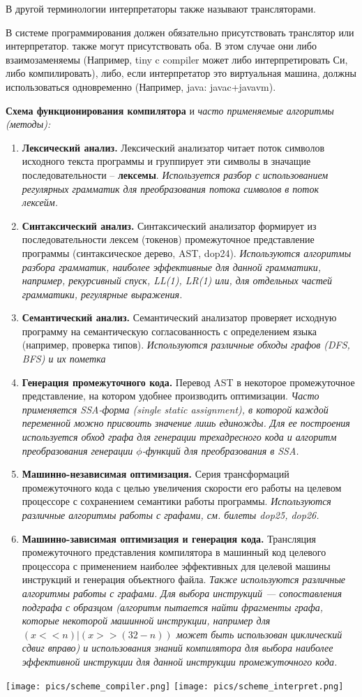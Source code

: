 В другой терминологии интерпретаторы также называют трансляторами.

В системе программирования должен обязательно присутствовать транслятор или интерпретатор.
также могут присутствовать оба. В этом случае они либо взаимозаменяемы (Например, tiny c compiler может либо интерпретировать Си, либо компилировать),
либо, если интерпретатор это виртуальная машина, должны использоваться одновременно (Например, java: javac+javavm).

\textbf{Схема функционирования компилятора} и \textit{часто применяемые алгоритмы (методы):}
\begin{enumerate}
    \item \textbf{Лексический анализ.} Лексический анализатор читает поток символов исходного текста программы и группирует эти символы в значащие последовательности -- \textbf{лексемы}.
    \textit{Используется разбор с использованием регулярных грамматик для преобразования потока символов в поток лексейм.}
    \item \textbf{Синтаксический анализ.} Синтаксический анализатор формирует из последовательности лексем (токенов) промежуточное представление программы (синтаксическое дерево, AST, dop24).
    	\textit{Используются алгоритмы разбора грамматик, наиболее эффективные для данной грамматики, например, рекурсивный спуск, LL(1), LR(1) или, для отдельных частей грамматики, регулярные выражения.}
    \item \textbf{Семантический анализ.} Семантический анализатор проверяет исходную программу на семантическую согласованность с определением языка (например, проверка типов). \textit{Используются различные обходы графов (DFS, BFS) и их пометка}
    \item \textbf{Генерация промежуточного кода.} Перевод AST в некоторое промежуточное представление, на котором удобнее производить оптимизации.
    	\textit{Часто применяется SSA-форма (single static assignment), в которой каждой переменной можно присвоить значение лишь единожды. Для ее построения используется обход графа для генерации трехадресного кода и алгоритм преобразования генерации $\phi$-функций для преобразования в SSA.}
    \item \textbf{Машинно-независимая оптимизация.} Серия трансформаций промежуточного кода с целью увеличения скорости его работы на целевом процессоре с сохранением семантики работы программы.
    	\textit{Используются различные алгоритмы работы с графами, см. билеты dop25, dop26.}
    \item \textbf{Машинно-зависимая оптимизация и генерация кода.} Трансляция промежуточного представления компилятора в машинный код целевого процессора с применением наиболее эффективных для целевой машины инструкций и генерация объектного файла. \textit{Также используются различные алгоритмы работы с графами. Для выбора инструкций --- сопоставления подграфа с образцом (алгоритм пытается найти фрагменты графа, которые некоторой машинной инструкции, например для \texttt{$(x << n) | (x >> (32 - n))$} может быть использован циклический сдвиг вправо) и использования знаний компилятора для выбора наиболее эффективной инструкции для данной инструкции промежуточного кода.}
\end{enumerate}

\texttt{[image: pics/scheme\_compiler.png]}%
\texttt{[image: pics/scheme\_interpret.png]}

